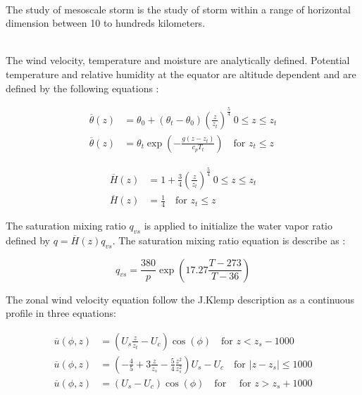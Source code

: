 \documentclass[times,doublespace]{fldauth}
\begin{document}
~\\ The study of mesoscale storm is the study of storm within a range of horizontal dimension  between 10 to hundreds kilometers. 

~\\The wind velocity, temperature and moisture are analytically defined. Potential temperature and relative humidity at the equator are altitude dependent and are defined by the following equations :

\begin{equation}
\begin{split}
\overline{\theta}(z)&=\theta_0 + (\theta_t - \theta_0)\left(\frac{z}{z_t}\right)^{\frac{5}{4}}  \ 0 \leq z \leq z_t \\
\overline{\theta}(z)&=\theta_t \exp\left(-\frac{g(z-z_t)}{c_pT_{t}}\right) \text{ ~~for   }  z_t \leq z
\end{split}
\end{equation}

 \begin{equation}
\begin{split}
\overline{H}(z)&=1 + \frac{3}{4}\left(\frac{z}{z_t}\right)^{\frac{5}{4}}  \ 0 \leq z \leq z_t \\
\overline{H}(z)&= \frac{1}{4} \text{ ~~for   }  z_t \leq z
\end{split}
\end{equation}

The saturation mixing ratio $q_{vs}$ is applied to initialize the water vapor ratio defined by $q = \overline{H}(z) q_{vs} $. The saturation mixing ratio equation is describe as :

 \begin{equation}
q_{vs}=\frac{380}{p}\exp\left(17.27\frac{ T-273}{T-36}\right)
\end {equation}

The zonal wind velocity equation follow the J.Klemp description as a continuous profile in three equations:

\begin{equation}
\begin{split}
\overline{u}(\phi,z)&=\left(U_s\frac{z}{z_t}-U_c\right)\cos(\phi)  \text{ ~~for   } z < z_s-1000 \\
\overline{u}(\phi,z)&=\left(-\frac{4}{5}+3\frac{z}{z_s}-\frac{5}{4}\frac{z^2}{z_s^2}\right)U_s-U_c \text{ ~~for   }  |z-z_s| \leq 1000 \\
\overline{u}(\phi,z)&=\left(U_s-U_c\right)\cos(\phi)  \text{ ~~for   } \text{ ~~for   }  z > z_s+1000 
\end{split}
\end{equation}
\end{document}
